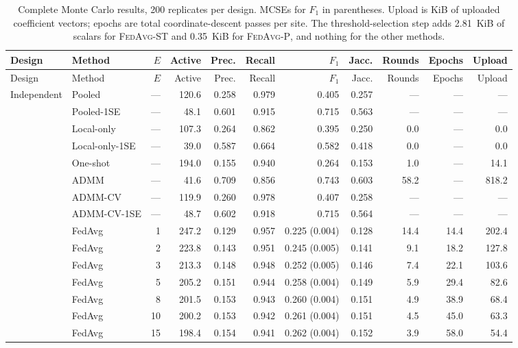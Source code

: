 \footnotesize
\setlength{\tabcolsep}{4.5pt}
\begin{longtable}{llrrrrrrrrr}
\caption{Complete Monte Carlo results, 200 replicates per design. MCSEs for $F_1$ in parentheses. Upload is KiB of uploaded coefficient vectors; epochs are total coordinate-descent passes per site. The threshold-selection step adds 2.81~KiB of scalars for \textsc{FedAvg-ST} and 0.35~KiB for \textsc{FedAvg-P}, and nothing for the other methods.}\label{tab:full}\\
\toprule
Design & Method & $E$ & Active & Prec. & Recall & $F_1$ & Jacc. & Rounds & Epochs & Upload \\
\midrule
\endfirsthead
\toprule
Design & Method & $E$ & Active & Prec. & Recall & $F_1$ & Jacc. & Rounds & Epochs & Upload \\
\midrule
\endhead
\bottomrule
\endfoot
Independent & Pooled & --- & 120.6 & 0.258 & 0.979 & 0.405 & 0.257 & --- & --- & --- \\
 & Pooled-1SE & --- & 48.1 & 0.601 & 0.915 & 0.715 & 0.563 & --- & --- & --- \\
 & Local-only & --- & 107.3 & 0.264 & 0.862 & 0.395 & 0.250 & 0.0 & --- & 0.0 \\
 & Local-only-1SE & --- & 39.0 & 0.587 & 0.664 & 0.582 & 0.418 & 0.0 & --- & 0.0 \\
 & One-shot & --- & 194.0 & 0.155 & 0.940 & 0.264 & 0.153 & 1.0 & --- & 14.1 \\
 & ADMM & --- & 41.6 & 0.709 & 0.856 & 0.743 & 0.603 & 58.2 & --- & 818.2 \\
 & ADMM-CV & --- & 119.9 & 0.260 & 0.978 & 0.407 & 0.258 & --- & --- & --- \\
 & ADMM-CV-1SE & --- & 48.7 & 0.602 & 0.918 & 0.715 & 0.564 & --- & --- & --- \\
 & FedAvg & 1 & 247.2 & 0.129 & 0.957 & 0.225 (0.004) & 0.128 & 14.4 & 14.4 & 202.4 \\
 & FedAvg & 2 & 223.8 & 0.143 & 0.951 & 0.245 (0.005) & 0.141 & 9.1 & 18.2 & 127.8 \\
 & FedAvg & 3 & 213.3 & 0.148 & 0.948 & 0.252 (0.005) & 0.146 & 7.4 & 22.1 & 103.6 \\
 & FedAvg & 5 & 205.2 & 0.151 & 0.944 & 0.258 (0.004) & 0.149 & 5.9 & 29.4 & 82.6 \\
 & FedAvg & 8 & 201.5 & 0.153 & 0.943 & 0.260 (0.004) & 0.151 & 4.9 & 38.9 & 68.4 \\
 & FedAvg & 10 & 200.2 & 0.153 & 0.942 & 0.261 (0.004) & 0.151 & 4.5 & 45.0 & 63.3 \\
 & FedAvg & 15 & 198.4 & 0.154 & 0.941 & 0.262 (0.004) & 0.152 & 3.9 & 58.0 & 54.4 \\

\end{longtable}
